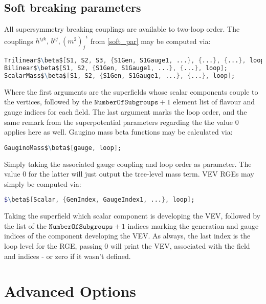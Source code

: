 \documentclass{scrartcl}
\begin{document}
\subsection{Soft breaking parameters}
All supersymmetry breaking couplings are available to two-loop order. The couplings  $h^{ijk},\, b^{ij}, \left(m^2\right)_j^{\;\;i}$ from \ref{soft_par} may be computed via:
\begin{lstlisting}[language=mathematica,mathescape,columns=flexible,backgroundcolor=\color{light-gray}]
Trilinear$\beta$[S1, S2, S3, {S1Gen, S1Gauge1, ...}, {...}, {...}, loop];
Bilinear$\beta$[S1, S2, {S1Gen, S1Gauge1, ...}, {...}, loop];
ScalarMass$\beta$[S1, S2, {S1Gen, S1Gauge1, ...}, {...}, loop];
\end{lstlisting}
Where the first arguments are the superfields whose scalar components couple to the vertices, followed by the $\mathtt{NumberOfSubgroups} + 1$ element list of flavour and gauge indices for each field. The last argument marks the loop order, and the same remark from the superpotential parameters regarding the the value $0$ applies here as well. Gaugino mass beta functions may be calculated via:
\begin{lstlisting}[language=mathematica,mathescape,columns=flexible,backgroundcolor=\color{light-gray}]
GauginoMass$\beta$[gauge, loop];
\end{lstlisting}
Simply taking the associated gauge coupling and loop order as parameter. The value $0$ for the latter will just output the tree-level mass term. VEV RGEs may simply be computed via:
\begin{lstlisting}[language=mathematica,mathescape,columns=flexible,backgroundcolor=\color{light-gray}]
$\beta$[Scalar, {GenIndex, GaugeIndex1, ...}, loop];
\end{lstlisting}
Taking the superfield which scalar component is developing the VEV, followed by the list of the $\mathtt{NumberOfSubgroups} + 1$ indices marking the generation and gauge indices of the component developing the VEV. As always, the last index is the loop level for the RGE, passing $0$ will print the VEV, associated with the field and indices - or zero if it wasn't defined.
\section{Advanced Options}
\end{document}
